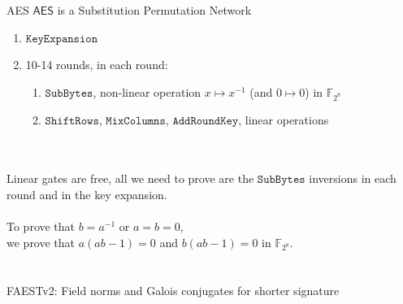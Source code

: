 \begin{frame}{AES}
  $\mathsf{AES}$ is a Substitution Permutation Network \\
  \begin{enumerate}
    \item $\texttt{KeyExpansion}$
    \item 10-14 rounds, in each round:
      \begin{enumerate}
        \item $\texttt{SubBytes}$, non-linear operation $x\mapsto x^{-1}$ (and $0\mapsto 0$) in $\mathbb{F}_{2^8}$
        \item $\texttt{ShiftRows}$, $\texttt{MixColumns}$, $\texttt{AddRoundKey}$, linear operations
      \end{enumerate}
  \end{enumerate}
  \pause
  \ \\\ \\
  Linear gates are free, all we need to prove are the $\texttt{SubBytes}$ inversions in each round and in the key expansion.
  \\\ \\
  \pause
  To prove that $b=a^{-1}$ or $a=b=0$, \\
  we prove that $a(ab-1)=0$ and $b(ab-1)=0$ in $\mathbb{F}_{2^8}$.
  \pause
  \\\ \\\ \\
  \vfill
  \scriptsize FAESTv2: Field norms and Galois conjugates for shorter signature
\end{frame}

